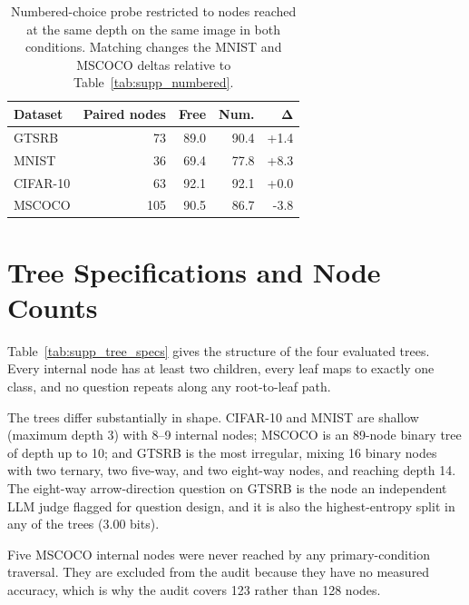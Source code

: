 \documentclass[10pt,twocolumn,letterpaper]{article}
\begin{document}
\begin{table}[t]
\centering
\caption{Numbered-choice probe restricted to nodes reached at the same depth on the same image in both conditions. Matching changes the MNIST and MSCOCO deltas relative to Table~\ref{tab:supp_numbered}.}
\label{tab:supp_numbered_paired}
\footnotesize
\begin{tabular}{@{}lrrrr@{}}
\toprule
\textbf{Dataset} & \textbf{Paired nodes} & \textbf{Free} & \textbf{Num.} & $\boldsymbol{\Delta}$ \\
\midrule
GTSRB     & 73 & 89.0 & 90.4 & +1.4 \\
MNIST     & 36 & 69.4 & 77.8 & +8.3 \\
CIFAR-10  & 63 & 92.1 & 92.1 & +0.0 \\
MSCOCO    & 105 & 90.5 & 86.7 & -3.8 \\
\bottomrule
\end{tabular}
\end{table}


\section{Tree Specifications and Node Counts}
\label{sec:supp_trees}

Table~\ref{tab:supp_tree_specs} gives the structure of the four evaluated
trees. Every internal node has at least two children, every leaf maps to
exactly one class, and no question repeats along any root-to-leaf path.

The trees differ substantially in shape. CIFAR-10 and MNIST are shallow
(maximum depth 3) with 8--9 internal nodes; MSCOCO is an 89-node binary tree of
depth up to 10; and GTSRB is the most irregular, mixing 16 binary nodes with
two ternary, two five-way, and two eight-way nodes, and reaching depth 14. The
eight-way arrow-direction question on GTSRB is the node an independent LLM
judge flagged for question design, and it is also the highest-entropy split in
any of the trees (3.00 bits).

Five MSCOCO internal nodes were never reached by any
primary-condition traversal. They are excluded from the audit because they
have no measured accuracy, which is why the audit covers 123 rather
than 128 nodes.
\end{document}
